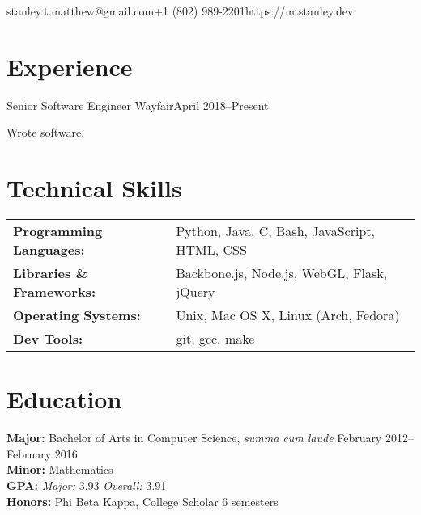 \documentclass[10pt]{resume}
\begin{document}

\vspace{0.5em}
{stanley.t.matthew@gmail.com}{+1 (802) 989-2201}{https://mtstanley.dev}

\section{Experience}

\expblock
{Senior Software Engineer \textnormal{Wayfair}}{April 2018--Present}
{
    \item Wrote software. %
}

\section{Technical Skills}

\begin{tabular}{>{\bfseries}l l}
Programming Languages:  &  Python, Java, C, Bash, JavaScript, HTML, CSS \\
Libraries \& Frameworks:&  Backbone.js, Node.js, WebGL, Flask, jQuery   \\
Operating Systems:      &  Unix, Mac OS X, Linux (Arch, Fedora)         \\
Dev Tools:              &  git, gcc, make                               \\
\end{tabular}

\section{Education}

\textbf{Major:} Bachelor of Arts in Computer Science, \textit{summa cum laude} \hfill February 2012--February 2016\\
\textbf{Minor:} Mathematics\\
\textbf{GPA:} \textit{Major:} 3.93 \textit{Overall:} 3.91\\
\textbf{Honors:} Phi Beta Kappa, College Scholar 6 semesters
\end{document}
